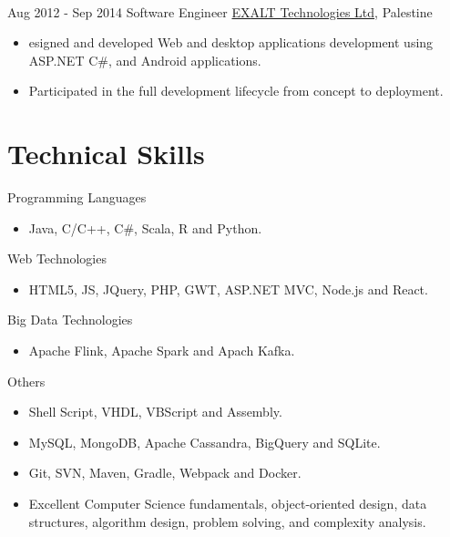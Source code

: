 \documentclass[letterpaper]{twentysecondcv} %
\begin{document}
\begin{twenty}
{{\begin{itemize}
        
    \end{itemize}}
        }
     \\
     \twentyitem
   		{Aug 2012 -}
		{Sep 2014}
        { Software Engineer}
        {}
        {\href{http://www.exalt-tech.com/about/}{EXALT Technologies Ltd}, Palestine}
        {
        \begin{itemize}
        \item esigned and developed Web and desktop applications development using ASP.NET C\#, and Android applications.
        \item Participated in the full development lifecycle from concept to deployment.
        
    \end{itemize}
    	}
        
\end{twenty}

\section{Technical  Skills}
\begin{twenty} %
	\twentyitem
	{}
	{}
	{Programming Languages}
	{}
	{}
	{ \begin{itemize}
			\item Java, C/C++, C\#, Scala, R and  Python.		
	\end{itemize}}

	\twentyitem
{}
{}
{Web Technologies}
{}
{}
{ \begin{itemize}
		\item HTML5, JS, JQuery, PHP,  GWT, ASP.NET MVC, Node.js and React.	
\end{itemize}}

		\twentyitem
	{}
	{}
	{Big Data Technologies}
	{}
	{}
	{ \begin{itemize}
			\item Apache Flink,  Apache
			Spark and Apach Kafka.		
	\end{itemize}}

		\twentyitem
{}
{}
{Others}
{}
{}
{ \begin{itemize}
		\item Shell Script, VHDL, VBScript and Assembly.	
		\item MySQL, MongoDB, Apache Cassandra, BigQuery and SQLite.
		\item Git, SVN, Maven, Gradle, Webpack and Docker.
		\item Excellent Computer Science fundamentals, object-oriented design, data structures, algorithm design, problem solving, and complexity analysis.	
\end{itemize}}



\end{twenty}
\end{document}
